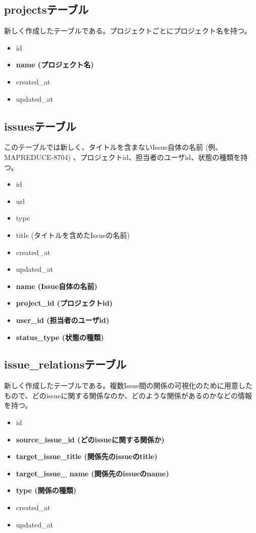 \documentclass[12pt, oneside]{jreport}
\begin{document}
		\subsection{projectsテーブル}
		新しく作成したテーブルである。プロジェクトごとにプロジェクト名を持つ。
		\begin{itemize}
		\item id
		\item {\bf name (プロジェクト名)}
		\item created\_at
		\item updated\_at
		\end{itemize}
		
		\subsection{issuesテーブル}
		このテーブルでは新しく、タイトルを含まないIssue自体の名前 (例、MAPREDUCE-8704) 、プロジェクトid、担当者のユーザid、状態の種類を持つ。
		\begin{itemize}
		\item id
		\item url
		\item type
		\item title (タイトルを含めたIssueの名前)
		\item created\_at
		\item updated\_at
		\item {\bf name (Issue自体の名前)}
		\item {\bf project\_id (プロジェクトid)}
		\item {\bf user\_id (担当者のユーザid)}
		\item {\bf status\_type (状態の種類)}
		\end{itemize}
				
		\subsection{issue\_relationsテーブル}
		新しく作成したテーブルである。複数Issue間の関係の可視化のために用意したもので、どのissueに関する関係なのか、どのような関係があるのかなどの情報を持つ。
		\begin{itemize}
		\item id
		\item {\bf source\_issue\_id (どのissueに関する関係か)}
		\item {\bf target\_issue\_title (関係先のissueのtitle)}
		\item {\bf target\_issue\_ name (関係先のissueのname)}
		\item {\bf type (関係の種類)}
		\item created\_at
		\item updated\_at
		\end{itemize}
\end{document}
